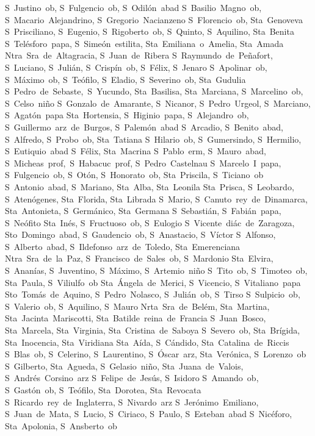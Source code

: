 S~Justino~ob, S~Fulgencio~ob, S~Odil\'on~abad
S~Basilio~Magno~ob, S~Macario~Alejandrino, S~Gregorio~Nacianzeno
S~Florencio~ob, Sta~Genoveva
S~Prisciliano, S~Eugenio, S~Rigoberto~ob, S~Quinto, S~Aquilino, Sta~Benita
S~Tel\'esforo~papa, S~Sime\'on~estilita, Sta~Emiliana~o~Amelia, Sta~Amada
Ntra~Sra~de~Altagracia, S~Juan~de~Ribera
S~Raymundo~de~Pe\~nafort, S~Luciano, S~Juli\'an, S~Crisp\'in~ob, S~F\'elix, S~Jenaro
S~Apolinar~ob, S~M\'aximo~ob, S~Te\'ofilo, S~Eladio, S~Severino~ob, Sta~Gudulia
S~Pedro~de~Sebaste,~S~Yucundo, Sta~Basilisa, Sta~Marciana, S~Marcelino~ob, S~Celso~ni\~no
S~Gonzalo~de~Amarante, S~Nicanor, S~Pedro~Urgeol, S~Marciano, S~Agat\'on~papa
Sta~Hortensia, S~Higinio~papa, S~Alejandro~ob, S~Guillermo~arz~de~Burgos, S~Palem\'on~abad
S~Arcadio, S~Benito~abad, S~Alfredo, S~Probo~ob, Sta~Tatiana
S~Hilario~ob, S~Gumersindo, S~Hermilio, S~Eutiquio~abad
S~F\'elix, Sta~Macrina
S~Pablo~erm, S~Mauro~abad, S~Micheas~prof,~S~Habacuc~prof, S~Pedro~Castelnau
S~Marcelo~I~papa, S~Fulgencio~ob, S~Ot\'on, S~Honorato~ob, Sta~Priscila, S~Ticiano~ob%
S~Antonio~abad, S~Mariano, Sta~Alba, Sta~Leonila
Sta~Prisca, S~Leobardo, S~Aten\'ogenes, Sta~Florida, Sta~Librada
S~Mario, S~Canuto~rey~de~Dinamarca, Sta~Antonieta, S~Germ\'anico, Sta~Germana
S~Sebasti\'an, S~Fabi\'an~papa, S~Ne\'ofito
Sta~In\'es, S~Fructuoso~ob, S~Eulogio
S~Vicente~di\'ac~de~Zaragoza, Sto~Domingo~abad, S~Gaudencio~ob, S~Anastacio, S~V\'ictor
S~Alfonso, S~Alberto~abad, S~Ildefonso~arz~de~Toledo, Sta~Emerenciana
Ntra~Sra~de~la~Paz, S~Francisco~de~Sales~ob, S~Mardonio
Sta~Elvira, S~Anan\'ias, S~Juventino, S~M\'aximo, S~Artemio~ni\~no
S~Tito~ob, S~Timoteo~ob, Sta~Paula, S~Viliulfo~ob
Sta~\'Angela~de~Merici, S~Vicencio, S~Vitaliano~papa
Sto~Tom\'as~de~Aquino, S~Pedro~Nolasco, S~Juli\'an~ob, S~Tirso
S~Sulpicio~ob, S~Valerio~ob, S~Aquilino, S~Mauro
Nrta~Sra~de~Bel\'em, Sta~Martina, Sta~Jacinta~Mariscotti, Sta~Batilde~reina~de~Francia
S~Juan~Bosco, Sta~Marcela, Sta~Virginia, Sta~Cristina~de~Saboya
S~Severo~ob, Sta~Br\'igida, Sta~Inocencia, Sta~Viridiana
Sta~A\'ida, S~C\'andido, Sta~Catalina~de~Riccis
S~Blas~ob, \vadjust{\vskip-1pt}S~Celerino, S~Laurentino, S~\'Oscar~arz, Sta~Ver\'onica, S~Lorenzo~ob
S~Gilberto, Sta~Agueda, S~Gelasio~ni\~no, Sta~Juana~de~Valois, S~Andr\'es~Corsino~arz
S~Felipe~de~Jes\'us, S~Isidoro
S~Amando~ob, S~Gast\'on~ob, S~Te\'ofilo, Sta~Dorotea, Sta~Revocata
S~Ricardo~rey~de~Inglaterra, S~Nivardo~arz
S~Jer\'onimo~Emiliano, S~Juan~de~Mata, S~Lucio, S~Ciriaco, S~Paulo, S~Esteban~abad
S~Nic\'eforo, Sta~Apolonia, S~Ansberto~ob

